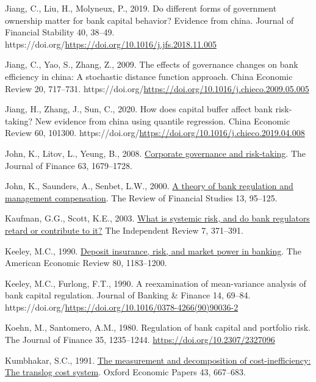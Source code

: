 \documentclass[
  12pt,
  a4paper,
]{scrreprt}
\newlength{\cslhangindent}
\newenvironment{CSLReferences}[2] %
 {\begin{list}{}{%
  \setlength{\itemindent}{0pt}
  \setlength{\leftmargin}{0pt}
  \setlength{\parsep}{0pt}
  \ifodd #1
   \setlength{\leftmargin}{\cslhangindent}
   \setlength{\itemindent}{-1\cslhangindent}
  \fi
  \setlength{\itemsep}{#2\baselineskip}}}
 {\end{list}}
\begin{document}
{{{{\begin{CSLReferences}{1}{0}
Jiang, C., Liu, H., Molyneux, P., 2019. Do different forms of government
ownership matter for bank capital behavior? Evidence from china. Journal
of Financial Stability 40, 38--49.
https://doi.org/\url{https://doi.org/10.1016/j.jfs.2018.11.005}

Jiang, C., Yao, S., Zhang, Z., 2009. The effects of governance changes
on bank efficiency in china: A stochastic distance function approach.
China Economic Review 20, 717--731.
https://doi.org/\url{https://doi.org/10.1016/j.chieco.2009.05.005}

Jiang, H., Zhang, J., Sun, C., 2020. How does capital buffer affect bank
risk-taking? New evidence from china using quantile regression. China
Economic Review 60, 101300.
https://doi.org/\url{https://doi.org/10.1016/j.chieco.2019.04.008}

John, K., Litov, L., Yeung, B., 2008.
\href{http://www.jstor.org.queens.ezp1.qub.ac.uk/stable/25094487}{Corporate
governance and risk-taking}. The Journal of Finance 63, 1679--1728.

John, K., Saunders, A., Senbet, L.W., 2000.
\href{http://www.jstor.org.queens.ezp1.qub.ac.uk/stable/2646082}{A
theory of bank regulation and management compensation}. The Review of
Financial Studies 13, 95--125.

Kaufman, G.G., Scott, K.E., 2003.
\href{http://www.jstor.org/stable/24562449}{What is systemic risk, and
do bank regulators retard or contribute to it?} The Independent Review
7, 371--391.

Keeley, M.C., 1990.
\href{http://www.jstor.org.queens.ezp1.qub.ac.uk/stable/2006769}{Deposit
insurance, risk, and market power in banking}. The American Economic
Review 80, 1183--1200.

Keeley, M.C., Furlong, F.T., 1990. A reexamination of mean-variance
analysis of bank capital regulation. Journal of Banking \& Finance 14,
69--84.
https://doi.org/\url{https://doi.org/10.1016/0378-4266(90)90036-2}

Koehn, M., Santomero, A.M., 1980. Regulation of bank capital and
portfolio risk. The Journal of Finance 35, 1235--1244.
\url{https://doi.org/10.2307/2327096}

Kumbhakar, S.C., 1991. \href{http://www.jstor.org/stable/2663415}{The
measurement and decomposition of cost-inefficiency: The translog cost
system}. Oxford Economic Papers 43, 667--683.


\end{CSLReferences}}}}}
\end{document}
